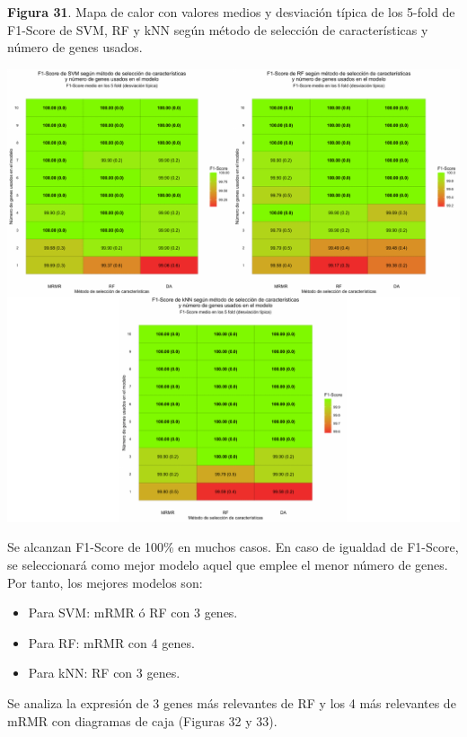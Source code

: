 \begin{center}
\textbf{Figura 31}. Mapa de calor con valores medios y desviación típica de los 5-fold de F1-Score de SVM, RF y kNN según método de selección de características y número de genes usados.
\end{center}
\begin{center}
	\includegraphics[width=1\textwidth]{figuras/31_cr_biclase_heatmap_horizontal.pdf} 
\end{center}

Se alcanzan F1-Score de 100\% en muchos casos. En caso de igualdad de F1-Score, se seleccionará como mejor modelo aquel que emplee el menor número de genes. Por tanto, los mejores modelos son:
\begin{itemize}
	\item Para SVM: mRMR ó RF con 3 genes.
	\item Para RF: mRMR con 4 genes.
	\item Para kNN: RF con 3 genes.
\end{itemize}

Se analiza la expresión de 3 genes más relevantes de RF y los 4 más relevantes de mRMR con diagramas de caja (Figuras 32 y 33).

